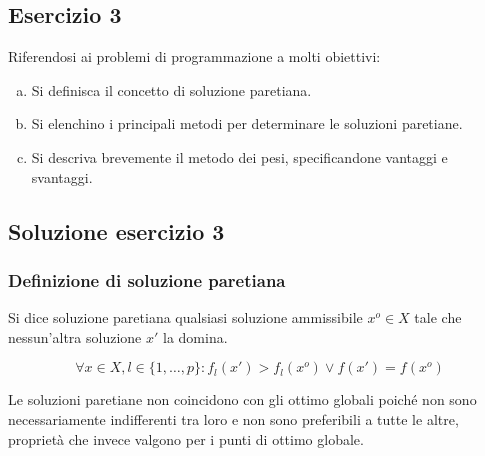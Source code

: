 \documentclass[\main/main.tex]{subfiles}
\begin{document}
\subsection{Esercizio 3}
Riferendosi ai problemi di programmazione a molti obiettivi:

\begin{enumerate}[a)]
  \item Si definisca il concetto di soluzione paretiana.
  \item Si elenchino i principali metodi per determinare le soluzioni paretiane.
  \item Si descriva brevemente il metodo dei pesi, specificandone vantaggi e svantaggi.
\end{enumerate}

\subsection{Soluzione esercizio 3}
\subsubsection*{Definizione di soluzione paretiana}
\begin{definition}
  Si dice soluzione paretiana qualsiasi soluzione ammissibile $x^o \in X$ tale che nessun'altra soluzione $x'$ la domina.

  \[
    \forall x \in X, l \in \{1,\ldots,p\}: f_l(x') > f_l(x^o) \lor f(x') = f(x^o)
  \]

  Le soluzioni paretiane non coincidono con gli ottimo globali poiché non sono necessariamente indifferenti tra loro e non sono preferibili a tutte le altre, proprietà che invece valgono per i punti di ottimo globale.
\end{definition}
\end{document}

